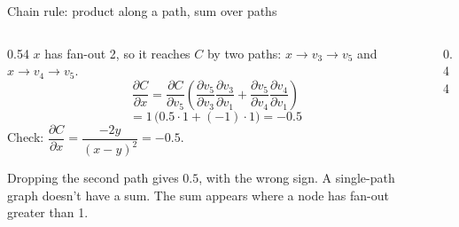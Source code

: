 \documentclass[aspectratio=169,xcolor=dvipsnames,svgnames,x11names,fleqn]{beamer}
\begin{document}
\begin{frame}{Chain rule: product along a path, sum over paths}
\begin{columns}[T]
\begin{column}{0.54\textwidth}
\small
$x$ has fan-out 2, so it reaches $C$ by two paths:
$x \to v_3 \to v_5$ and $x \to v_4 \to v_5$.
\[
\frac{\partial C}{\partial x}
= \frac{\partial C}{\partial v_5}
\left(
\frac{\partial v_5}{\partial v_3}\frac{\partial v_3}{\partial v_1}
+
\frac{\partial v_5}{\partial v_4}\frac{\partial v_4}{\partial v_1}
\right)
\]
\[
= 1\,\big(0.5 \cdot 1 + (-1)\cdot 1\big) = -0.5
\]
Check: $\dfrac{\partial C}{\partial x} = \dfrac{-2y}{(x-y)^2} = -0.5$.

\medskip
{\color{adAccent}Dropping the second path gives $0.5$, with the wrong
sign.} A single-path graph doesn't have a sum. The sum appears  where a node has fan-out greater than 1.
\end{column}
\begin{column}{0.44\textwidth}
\centering
{}
\end{column}
\end{columns}
\end{frame}
\end{document}
